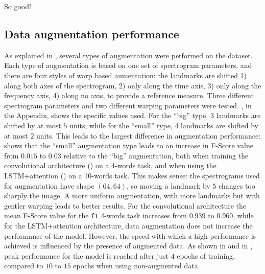 So good!

\subsection{Data augmentation performance}
\label{sec:augmentation_performance}


As explained in , several types of augmentation
were performed on the dataset.
Each type of augmentation is based on one set of spectrogram parameters,
and there are four styles of warp based aumentation:
the landmarks are shifted
1) along both axes of the spectrogram,
2) only along the time axis,
3) only along the frequency axis,
4) along no axis, to provide a reference measure.
Three different spectrogram parameters and two different warping parameters
were tested.
, in the Appendix, shows the specific values used.
For the ``big'' type, $3$ landmarks are shifted by at most $5$ units,
while for the ``small'' type, $4$ landmarks are shifted by at most $2$ units.
This leads to the largest difference in augmentation performance:
 shows that the ``small'' augmentation
type leads to an increase in F-Score value from $0.015$ to $0.03$ relative to
the ``big'' augmentation, both when training the convolutional architecture
() on a 4-words task, and when using the
LSTM+attention () on a 10-words task.
This makes sense: the spectrograms used for augmentation have shape $(64, 64)$,
so moving a landmark by $5$ changes too sharply the image.
A more uniform augmentation, with more landmarks but with 
gentler
warping leads to better results.
For the convolutional architecture the mean F-Score value for the 
\texttt{f1} 4-words task increases from $0.939$ to $0.960$,
while for the LSTM+attention architecture, data augmentation does not increase
the performance of the model.
However, the speed with which a high performance is achieved is influenced
by the presence of augmented data.
As shown in  and in
, 
peak performance for the model is reached after just $4$ epochs of training,
compared to $10$ to $15$ epochs when using non-augmented data.

